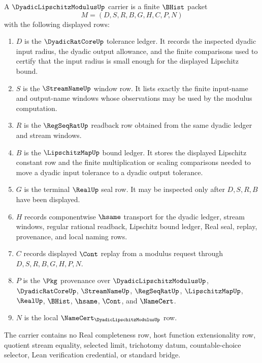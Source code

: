\begin{definition}
\label{def:dyadic-lipschitz-modulus-carrier}
A $\DyadicLipschitzModulusUp$ carrier is a finite $\BHist$ packet
$$
M=(D,S,R,B,G,H,C,P,N)
$$
with the following displayed rows:
\begin{enumerate}
\item $D$ is the $\DyadicRatCoreUp$ tolerance ledger. It records the inspected dyadic input radius, the dyadic output allowance, and the finite comparisons used to certify that the input radius is small enough for the displayed Lipschitz bound.
\item $S$ is the $\StreamNameUp$ window row. It lists exactly the finite input-name and output-name windows whose observations may be used by the modulus computation.
\item $R$ is the $\RegSeqRatUp$ readback row obtained from the same dyadic ledger and stream windows.
\item $B$ is the $\LipschitzMapUp$ bound ledger. It stores the displayed Lipschitz constant row and the finite multiplication or scaling comparisons needed to move a dyadic input tolerance to a dyadic output tolerance.
\item $G$ is the terminal $\RealUp$ seal row. It may be inspected only after $D,S,R,B$ have been displayed.
\item $H$ records componentwise $\hsame$ transport for the dyadic ledger, stream windows, regular rational readback, Lipschitz bound ledger, Real seal, replay, provenance, and local naming rows.
\item $C$ records displayed $\Cont$ replay from a modulus request through $D,S,R,B,G,H,P,N$.
\item $P$ is the $\Pkg$ provenance over $\DyadicLipschitzModulusUp$, $\DyadicRatCoreUp$, $\StreamNameUp$, $\RegSeqRatUp$, $\LipschitzMapUp$, $\RealUp$, $\BHist$, $\hsame$, $\Cont$, and $\NameCert$.
\item $N$ is the local $\NameCert_{\DyadicLipschitzModulusUp}$ row.
\end{enumerate}
The carrier contains no Real completeness row, host function extensionality row, quotient stream equality, selected limit, trichotomy datum, countable-choice selector, Lean verification credential, or standard bridge.
\end{definition}

